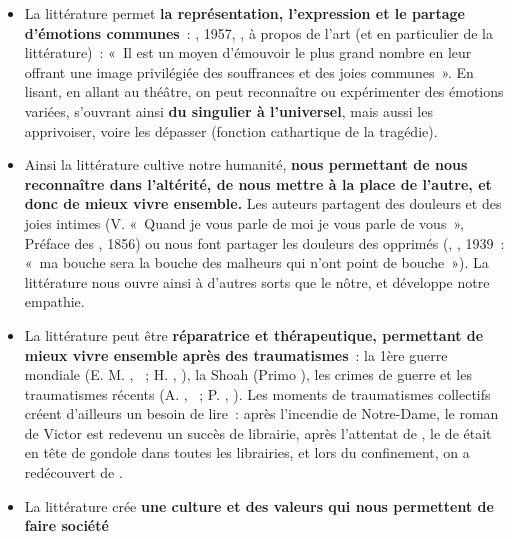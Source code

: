 {\begin{itemize}
\item La littérature permet \textbf{la représentation, l'expression et le partage d'émotions
communes}~: , 1957, , à propos de l'art (et en particulier de
la littérature)~: «~Il est un moyen d'émouvoir le plus grand nombre en leur offrant une
image privilégiée des souffrances et des joies communes~». En lisant, en allant au
théâtre, on peut reconnaître ou expérimenter des émotions variées, s'ouvrant ainsi \textbf{du
singulier à l'universel}, mais aussi les apprivoiser, voire les dépasser (fonction
cathartique de la tragédie).
\item Ainsi la littérature cultive notre humanité, \textbf{nous permettant de nous reconnaître dans
l'altérité, de nous mettre à la place de l'autre, et donc de mieux vivre ensemble.}
Les auteurs partagent des douleurs et des joies intimes (V.  «~Quand je vous parle
de moi je vous parle de vous~», Préface des , 1856) ou nous font
partager les douleurs des opprimés (, , 1939~:
«~ma bouche sera la bouche des malheurs qui n'ont point de bouche~»). La littérature
nous ouvre ainsi à d'autres sorts que le nôtre, et développe notre empathie.
\item La littérature peut être \textbf{réparatrice et thérapeutique, permettant de mieux vivre
ensemble après des traumatismes}~: la 1ère guerre mondiale (E. M. , ~; H. , ), la Shoah (Primo ), les crimes de
guerre et les traumatismes récents (A. , ~; P. ,
). Les moments de traumatismes collectifs créent d'ailleurs un besoin de
lire~: après l'incendie de Notre-Dame, le roman de Victor  est redevenu un succès
de librairie, après l'attentat de , le  de 
était en tête de gondole dans toutes les librairies, et lors du confinement, on a
redécouvert  de .
\item La littérature crée \textbf{une culture et des valeurs qui nous permettent de faire société
}
\end{itemize}}
